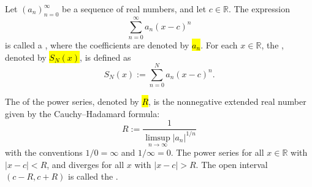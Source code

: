 \begin{definition} \label{definition:real_power_series_and_radius_of_convergence}
    Let $(a_n)_{n=0}^\infty$ be a sequence of real numbers, and let $c \in \mathbb{R}$. The expression
    $$\sum_{n=0}^\infty a_n (x - c)^n$$
    is called a , where the coefficients are denoted by \hl{$a_n$}. For each $x \in \mathbb{R}$, the , denoted by \hl{$S_N(x)$}, is defined as
    $$S_N(x) := \sum_{n=0}^N a_n (x - c)^n.$$

    The  of the power series, denoted by \hl{$R$}, is the nonnegative extended real number given by the Cauchy--Hadamard formula:
    $$R := \frac{1}{\limsup_{n \to \infty} |a_n|^{1/n}}$$
    with the conventions $1/0 = \infty$ and $1/\infty = 0$. The power series  for all $x \in \mathbb{R}$ with $|x - c| < R$, and diverges for all $x$ with $|x - c| > R$. The open interval $(c - R, c + R)$ is called the .
\end{definition}
